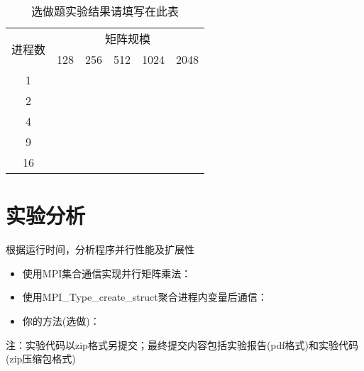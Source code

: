 \documentclass{SYSUReport}
\begin{document}
\begin{table}[H]
\centering
\caption{选做题实验结果请填写在此表}
\label{表3}
\begin{tabular}{|c|lllll|}
\hline
\multirow{2}{*}{进程数} & \multicolumn{5}{c|}{矩阵规模}                                                                        \\ \cline{2-6} 
 & \multicolumn{1}{l|}{128} & \multicolumn{1}{l|}{256} & \multicolumn{1}{l|}{512} & \multicolumn{1}{l|}{1024} & 2048 \\ \hline
1                    & \multicolumn{1}{l|}{} & \multicolumn{1}{l|}{} & \multicolumn{1}{l|}{} & \multicolumn{1}{l|}{} &  \\ \hline
2                    & \multicolumn{1}{l|}{} & \multicolumn{1}{l|}{} & \multicolumn{1}{l|}{} & \multicolumn{1}{l|}{} &  \\ \hline
4                    & \multicolumn{1}{l|}{} & \multicolumn{1}{l|}{} & \multicolumn{1}{l|}{} & \multicolumn{1}{l|}{} &  \\ \hline
9                    & \multicolumn{1}{l|}{} & \multicolumn{1}{l|}{} & \multicolumn{1}{l|}{} & \multicolumn{1}{l|}{} &  \\ \hline
16                   & \multicolumn{1}{l|}{} & \multicolumn{1}{l|}{} & \multicolumn{1}{l|}{} & \multicolumn{1}{l|}{} &  \\ \hline
\end{tabular}
\end{table}


\section{实验分析}
根据运行时间，分析程序并行性能及扩展性
\begin{itemize}
    \item 使用MPI集合通信实现并行矩阵乘法：
    \item 使用MPI\_Type\_create\_struct聚合进程内变量后通信：
    \item 你的方法(选做)：
\end{itemize}
注：实验代码以zip格式另提交；最终提交内容包括实验报告(pdf格式)和实验代码(zip压缩包格式)
\end{document}

